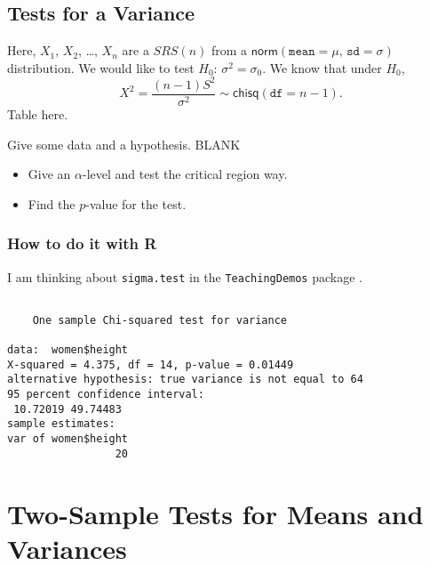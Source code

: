 \documentclass[]{book}
\newenvironment{Shaded}{\begin{snugshade}}{\end{snugshade}}
\newcommand{\KeywordTok}[1]{\textcolor[rgb]{0.13,0.29,0.53}{\textbf{{#1}}}}
\newcommand{\DataTypeTok}[1]{\textcolor[rgb]{0.13,0.29,0.53}{{#1}}}
\newcommand{\DecValTok}[1]{\textcolor[rgb]{0.00,0.00,0.81}{{#1}}}
\newcommand{\NormalTok}[1]{{#1}}
\providecommand{\tightlist}{%
  \setlength{\itemsep}{0pt}\setlength{\parskip}{0pt}}
\numberwithin{equation}{chapter}
\numberwithin{figure}{chapter}
\theoremstyle{plain}
\theoremstyle{definition}
\theoremstyle{remark}
\theoremstyle{definition}
\theoremstyle{definition}
\theoremstyle{remark}
\let\BeginKnitrBlock\begin \let\EndKnitrBlock\end
\begin{document}
\subsection{Tests for a Variance}\label{tests-for-a-variance}

Here, \(X_{1}\), \(X_{2}\), \ldots{}, \(X_{n}\) are a \(SRS(n)\) from a
\(\mathsf{norm}(\mathtt{mean} = \mu,\,\mathtt{sd} = \sigma)\)
distribution. We would like to test \(H_{0}:\,\sigma^{2} = \sigma_{0}\).
We know that under \(H_{0}\), \[ X^{2} = \frac{(n -
1)S^{2}}{\sigma^{2}} \sim \mathsf{chisq}(\mathtt{df} = n - 1).  \] Table
here.

\BeginKnitrBlock{example}
\protect\hypertarget{ex:unnamed-chunk-399}{}{\label{ex:unnamed-chunk-399}}Give
some data and a hypothesis. BLANK

\begin{itemize}
\tightlist
\item
  Give an \(\alpha\)-level and test the critical region way.
\item
  Find the \(p\)-value for the test.
\end{itemize}
\EndKnitrBlock{example}

\subsubsection{How to do it with R}\label{how-to-do-it-with-r-41}

I am thinking about \texttt{sigma.test}
 in the \texttt{TeachingDemos}
package \autocite{TeachingDemos}.

\begin{Shaded}
\end{Shaded}

\begin{verbatim}

    One sample Chi-squared test for variance

data:  women$height
X-squared = 4.375, df = 14, p-value = 0.01449
alternative hypothesis: true variance is not equal to 64
95 percent confidence interval:
 10.72019 49.74483
sample estimates:
var of women$height 
                 20 
\end{verbatim}

\section{Two-Sample Tests for Means and
Variances}\label{sec-two-sample-tests-for-means}
\end{document}
